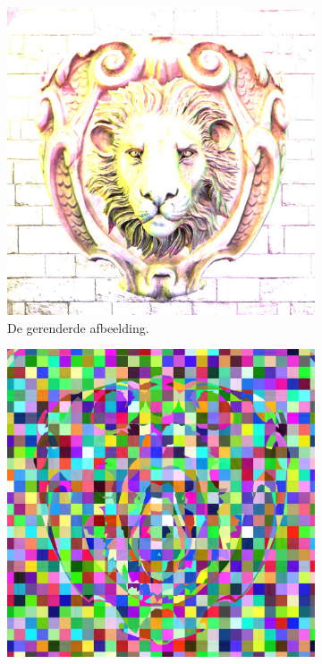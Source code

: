 \begin{figure}[tb]
  \centering
  \begin{subfigure}[b]{0.32\textwidth}
    \includegraphics[width=\textwidth]{./img/raw/cs-opdeling-voorbeeld/render.png}
    \caption{De gerenderde afbeelding.}
    \label{fig:cs-opdeling-voorbeeld:render}
  \end{subfigure}%
  \begin{subfigure}[b]{0.32\textwidth}
    \includegraphics[width=\textwidth]{./img/raw/cs-opdeling-voorbeeld/depth.png}

\end{subfigure}
\end{figure}
